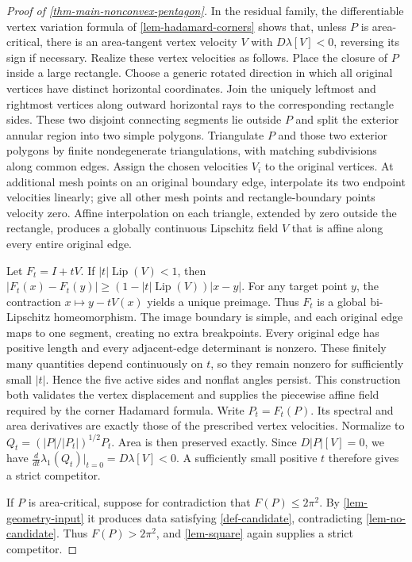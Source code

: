 \documentclass[11pt,a4paper]{article}
\theoremstyle{proofmanuscript}
\begin{document}
\begin{proof}[Proof of \ref{thm-main-nonconvex-pentagon}]
In the residual family, the differentiable vertex variation formula of \ref{lem-hadamard-corners} shows that, unless \(P\) is area-critical, there is an area-tangent vertex velocity \(V\) with \(D\lambda[V]<0\), reversing its sign if necessary. Realize these vertex velocities as follows. Place the closure of \(P\) inside a large rectangle. Choose a generic rotated direction in which all original vertices have distinct horizontal coordinates. Join the uniquely leftmost and rightmost vertices along outward horizontal rays to the corresponding rectangle sides. These two disjoint connecting segments lie outside \(P\) and split the exterior annular region into two simple polygons. Triangulate \(P\) and those two exterior polygons by finite nondegenerate triangulations, with matching subdivisions along common edges. Assign the chosen velocities \(V_i\) to the original vertices. At additional mesh points on an original boundary edge, interpolate its two endpoint velocities linearly; give all other mesh points and rectangle-boundary points velocity zero. Affine interpolation on each triangle, extended by zero outside the rectangle, produces a globally continuous Lipschitz field \(V\) that is affine along every entire original edge.

Let \(F_t=I+tV\). If \(|t|\operatorname{Lip}(V)<1\), then \(|F_t(x)-F_t(y)|\ge(1-|t|\operatorname{Lip}(V))|x-y|\). For any target point \(y\), the contraction \(x\mapsto y-tV(x)\) yields a unique preimage. Thus \(F_t\) is a global bi-Lipschitz homeomorphism. The image boundary is simple, and each original edge maps to one segment, creating no extra breakpoints. Every original edge has positive length and every adjacent-edge determinant is nonzero. These finitely many quantities depend continuously on \(t\), so they remain nonzero for sufficiently small \(|t|\). Hence the five active sides and nonflat angles persist. This construction both validates the vertex displacement and supplies the piecewise affine field required by the corner Hadamard formula. Write \(P_t=F_t(P)\). Its spectral and area derivatives are exactly those of the prescribed vertex velocities. Normalize to \(Q_t=(|P|/|P_t|)^{1/2}P_t\). Area is then preserved exactly. Since \(D|P|[V]=0\), we have \(\frac d{dt}\lambda_1(Q_t)|_{t=0}=D\lambda[V]<0\). A sufficiently small positive \(t\) therefore gives a strict competitor.

If \(P\) is area-critical, suppose for contradiction that \(F(P)\le2\pi^2\). By \ref{lem-geometry-input} it produces data satisfying \ref{def-candidate}, contradicting \ref{lem-no-candidate}. Thus \(F(P)>2\pi^2\), and \ref{lem-square} again supplies a strict competitor.


\end{proof}
\end{document}
